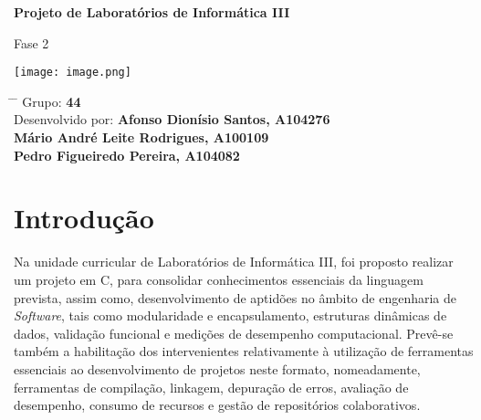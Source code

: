 \documentclass[12pt,a4paper]{article}
\title{}
\author{}
\date{}
\begin{document}
	
	\newcommand{\subf}[2]{%
		{\small\begin{tabular}[t]{@{}c@{}}
				#1\\#2
		\end{tabular}}%
	}
	
	\begin{titlepage}
		\begin{center}
			\vspace*{3cm}
   
			\Huge
			\textbf{Projeto de Laboratórios de Informática III}
			\vspace{0.3cm}
			\Huge
   
			Fase 2
			\vspace{0.8cm}
   
			\large
			\vspace{1.5cm}
			\LARGE
			\vspace{1.5cm}
			\textbf{}
            \texttt{[image: image.png]}
			\vfill
			\vspace{1.0cm}
			\Large
			
		\end{center}
		\Large
		\begin{tabbing}
			\hspace*{1em}\= \hspace*{8em} \= \kill %
            \> Grupo: \textbf{44} \\
			\> Desenvolvido por: \textbf{Afonso Dionísio Santos, A104276} \\
            \>\>\textbf{Mário André Leite Rodrigues, A100109} \\
            \>\>\textbf{Pedro Figueiredo Pereira, A104082} \\
			
		\end{tabbing}
		
	\end{titlepage}
	
	\tableofcontents
	\newpage
    \section{Introdução}
    \hspace{0,6cm}Na unidade curricular de Laboratórios de Informática III, foi proposto realizar um projeto em C, para consolidar conhecimentos essenciais da linguagem prevista, assim como, desenvolvimento de aptidões no âmbito de engenharia de \textit{Software}, tais como modularidade e encapsulamento, estruturas dinâmicas de dados, validação funcional e medições de desempenho computacional. Prevê-se também a habilitação dos intervenientes relativamente à utilização de ferramentas essenciais ao desenvolvimento de projetos neste formato, nomeadamente, ferramentas de compilação, linkagem, depuração de erros, avaliação de desempenho, consumo de recursos e gestão de repositórios colaborativos. \\
        
\end{document}
